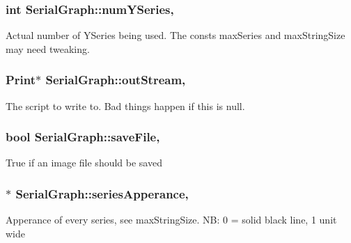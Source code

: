 \subsubsection[{num\+Y\+Series}]{\setlength{\rightskip}{0pt plus 5cm}int Serial\+Graph\+::num\+Y\+Series\hspace{0.3cm}{\ttfamily [protected]}, {\ttfamily [inherited]}}\label{class_serial_graph_ab40c430e06102b9624736173d4a58596}
Actual number of Y\+Series being used. The consts max\+Series and max\+String\+Size may need tweaking. \hypertarget{class_serial_graph_aec32289a9393e98bf80d44406e5c207d}{}
\subsubsection[{out\+Stream}]{\setlength{\rightskip}{0pt plus 5cm}Print$\ast$ Serial\+Graph\+::out\+Stream\hspace{0.3cm}{\ttfamily [protected]}, {\ttfamily [inherited]}}\label{class_serial_graph_aec32289a9393e98bf80d44406e5c207d}
The script to write to. Bad things happen if this is null. \hypertarget{class_serial_graph_a24202e0a7a8bac5ec1cfd92bf796e078}{}
\subsubsection[{save\+File}]{\setlength{\rightskip}{0pt plus 5cm}bool Serial\+Graph\+::save\+File\hspace{0.3cm}{\ttfamily [protected]}, {\ttfamily [inherited]}}\label{class_serial_graph_a24202e0a7a8bac5ec1cfd92bf796e078}
True if an image file should be saved \hypertarget{class_serial_graph_a8d743f9eeeca69a988d2159a405e4253}{}
\subsubsection[{series\+Apperance}]{$\ast$ Serial\+Graph\+::series\+Apperance\hspace{0.3cm}{\ttfamily [protected]}, {\ttfamily [inherited]}}\label{class_serial_graph_a8d743f9eeeca69a988d2159a405e4253}
Apperance of every series, see max\+String\+Size. N\+B\+: 0 = solid black line, 1 unit wide \hypertarget{class_serial_graph_a2307e40e27249f44bbe14776dc68c561}{}
